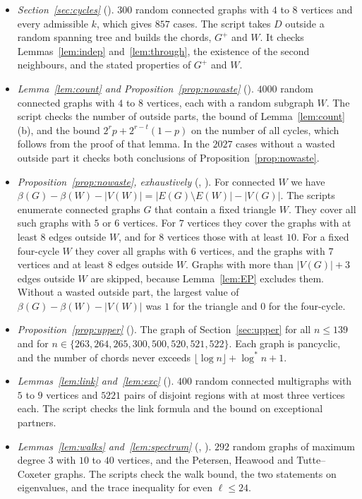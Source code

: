 \documentclass[11pt]{article}
\theoremstyle{definition}
\theoremstyle{remark}
\newcommand{\lgs}{\log^{*}}
\newcommand{\sm}{\setminus}
\numberwithin{equation}{section}
\begin{document}
\begin{itemize}
\item \emph{Section~\ref{sec:cycles}} (). $300$ random connected graphs with
$4$ to $8$ vertices and every admissible $k$, which gives $857$ cases. The script takes $D$ outside a
random spanning tree and builds the chords, $G^{+}$ and $W$. It checks Lemmas~\ref{lem:indep}
and~\ref{lem:through}, the existence of the second neighbours, and the stated properties of
$G^{+}$ and $W$.
\item \emph{Lemma~\ref{lem:count} and Proposition~\ref{prop:nowaste}}
(). $4000$ random connected graphs with $4$ to $8$ vertices, each with a
random subgraph $W$. The script checks the number of outside parts, the bound of
Lemma~\ref{lem:count}(b), and the bound $2^{r}p+2^{r-t}(1-p)$ on the number of all cycles, which follows from the proof of
that lemma. In the
$2027$ cases without a wasted outside part it checks both conclusions of
Proposition~\ref{prop:nowaste}.
\item \emph{Proposition~\ref{prop:nowaste}, exhaustively} (,
). For connected $W$ we have
$\beta(G)-\beta(W)-|V(W)|=|E(G)\sm E(W)|-|V(G)|$. The scripts enumerate connected graphs $G$
that contain a fixed triangle $W$. They cover all such graphs with $5$ or $6$ vertices. For $7$
vertices they cover the graphs with at least $8$ edges outside $W$, and for $8$ vertices those with
at least $10$. For a fixed four-cycle $W$ they cover all graphs with $6$ vertices, and the graphs
with $7$ vertices and at least $8$ edges outside $W$. Graphs with more than $|V(G)|+3$ edges outside $W$ are skipped, because
Lemma~\ref{lem:EP} excludes them. Without a wasted outside part, the largest value of
$\beta(G)-\beta(W)-|V(W)|$ was $1$ for the triangle and $0$ for the four-cycle.
\item \emph{Proposition~\ref{prop:upper}} (). The graph of
Section~\ref{sec:upper} for all $n\le139$ and for $n\in\{263,264,265,300,500,520,521,522\}$. Each
graph is pancyclic, and the number of chords never exceeds $\lfloor\log n\rfloor+\lgs n+1$.
\item \emph{Lemmas~\ref{lem:link} and~\ref{lem:exc}} (). $400$ random connected
multigraphs with $5$ to $9$ vertices and $5221$ pairs of disjoint regions with at most three
vertices each. The script checks the link formula and the bound on exceptional partners.
\item \emph{Lemmas~\ref{lem:walks} and~\ref{lem:spectrum}} (,
). $292$ random graphs of maximum degree $3$ with $10$ to $40$ vertices, and the
Petersen, Heawood and Tutte--Coxeter graphs. The scripts check the walk bound, the two statements
on eigenvalues, and the trace inequality for even $\ell\le24$.
\end{itemize}
\end{document}
